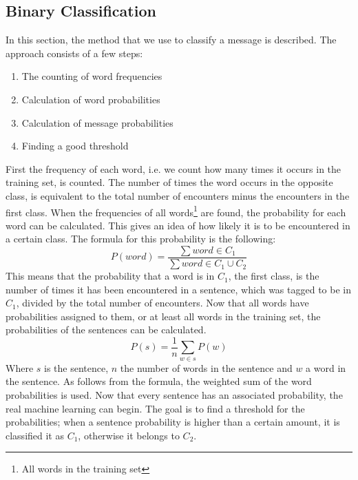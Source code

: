 \documentclass[11pt]{article}
\begin{document}
\subsection{Binary Classification}
In this section, the method that we use to classify a message is described. The approach consists of a few steps:
\begin{enumerate}
\item The counting of word frequencies
\item Calculation of word probabilities
\item Calculation of message probabilities
\item Finding a good threshold
\end{enumerate}
First the frequency of each word, i.e. we count how many times it occurs in the training set, is counted. The number of times the word occurs in the opposite class, is equivalent to the total number of encounters minus the encounters in the first class.
When the frequencies of all words\footnote{All words in the training set} are found, the probability for each word can be calculated. This gives an idea of how likely it is to be encountered in a certain class. The formula for this probability is the following:
\begin{equation}
P(word) = \frac{ \sum word \in C_1}{\sum word \in C_1\cup C_2}
\end{equation}
This means that the probability that a word is in $C_1$, the first class, is the number of times it has been encountered in a sentence, which was tagged to be in $C_1$, divided by the total number of encounters.
Now that all words have probabilities assigned to them, or at least all words in the training set, the probabilities of the sentences can be calculated.
\begin{equation}
P(s) = \frac{1}{n} \sum_{w \in s} P(w)
\end{equation}
Where $s$ is the sentence, $n$ the number of words in the sentence and $w$ a word in the sentence. As follows from the formula, the weighted sum of the word probabilities is used.
Now that every sentence has an associated probability, the real machine learning can begin. The goal is to find a threshold for the probabilities; when a sentence probability is higher than a certain amount, it is classified it as $C_1$, otherwise it belongs to $C_2$.
\end{document}
